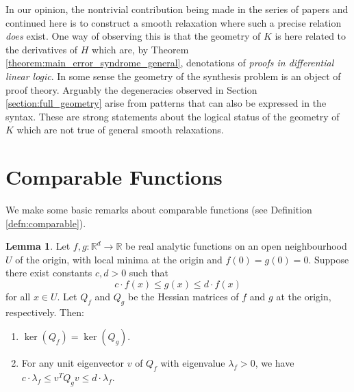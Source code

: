 \documentclass[english,letter paper,12pt,reqno]{article}
\theoremstyle{definition}
\newtheorem{lemma}[theorem]{Lemma}
\begin{document}
In our opinion, the nontrivial contribution being made in the series of papers \cite{clift2018derivatives,clift2021geometry,waring2021geometric} and continued here is to construct a smooth relaxation where such a precise relation \emph{does} exist. One way of observing this is that the geometry of $K$ is here related to the derivatives of $H$ which are, by Theorem \ref{theorem:main_error_syndrome_general}, denotations of \emph{proofs in differential linear logic}. In some sense the geometry of the synthesis problem is an object of proof theory. Arguably the degeneracies observed in Section \ref{section:full_geometry} arise from patterns that can also be expressed in the syntax. These are strong statements about the logical status of the geometry of $K$ which are not true of general smooth relaxations.

\section{Comparable Functions}\label{section:compare_functions}

We make some basic remarks about comparable functions (see Definition \ref{defn:comparable}).

\begin{lemma}\label{lemma:comparable_hessian}
Let $f, g: \mathbb{R}^d \to \mathbb{R}$ be real analytic functions on an open neighbourhood $U$ of the origin, with local minima at the origin and $f(0) = g(0) = 0$. Suppose there exist constants $c, d > 0$ such that 
\begin{equation}
c \cdot f(x) \leq g(x) \leq d \cdot f(x)
\end{equation}
for all $x \in U$. Let $Q_f$ and $Q_g$ be the Hessian matrices of $f$ and $g$ at the origin, respectively. Then:
\begin{enumerate}
\item[(i)] $\ker(Q_f) = \ker(Q_g)$.
\item[(ii)] For any unit eigenvector $v$ of $Q_f$ with eigenvalue $\lambda_f > 0$, we have $c \cdot \lambda_f \leq v^T Q_g v \leq d \cdot \lambda_f$.
\end{enumerate}
\end{lemma}
\end{document}
